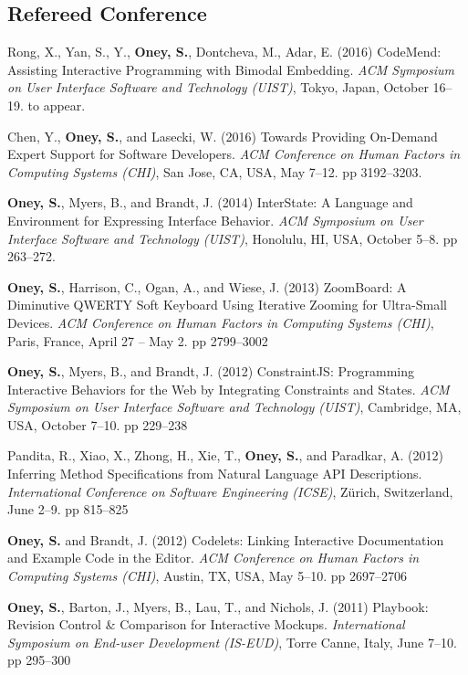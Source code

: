 \subsection{Refereed Conference}

 {
    Rong, X., Yan, S., Y., \textbf{Oney, S.}, Dontcheva, M., Adar, E. (2016) CodeMend: Assisting Interactive Programming with Bimodal Embedding. \textit{ACM Symposium on User Interface Software and Technology (UIST)}, Tokyo, Japan, October 16--19. to appear.
}

 {
    Chen, Y., \textbf{Oney, S.}, and Lasecki, W. (2016) Towards Providing On-Demand Expert Support for Software Developers. \textit{ACM Conference on Human Factors in Computing Systems (CHI)}, San Jose, CA, USA, May 7--12. pp 3192--3203.
}

 {
    \textbf{Oney, S.}, Myers, B., and Brandt, J. (2014) InterState: A Language and Environment for Expressing Interface Behavior. \textit{ACM Symposium on User Interface Software and Technology (UIST)}, Honolulu, HI, USA, October 5--8.  pp 263--272.
}

 {
\textbf{Oney, S.}, Harrison, C., Ogan, A., and Wiese, J. (2013) ZoomBoard: A Diminutive QWERTY Soft Keyboard Using Iterative Zooming for Ultra-Small Devices. \textit{ACM Conference on Human Factors in Computing Systems (CHI)}, Paris, France, April 27 -- May 2. pp 2799--3002
}

 {
\textbf{Oney, S.}, Myers, B., and Brandt, J. (2012) ConstraintJS: Programming Interactive Behaviors for the Web by Integrating Constraints and States. \textit{ACM Symposium on User Interface Software and Technology (UIST)}, Cambridge, MA, USA, October 7--10. pp 229--238
}

 {
Pandita, R., Xiao, X., Zhong, H., Xie, T., \textbf{Oney, S.}, and Paradkar, A. (2012) Inferring Method Specifications from Natural Language API Descriptions. \textit{International Conference on Software Engineering (ICSE)}, Z{\"u}rich, Switzerland, June 2--9. pp 815--825
}

 {
\textbf{Oney, S.} and Brandt, J. (2012) Codelets: Linking Interactive Documentation and Example Code in the Editor. \textit{ACM Conference on Human Factors in Computing Systems (CHI)}, Austin, TX, USA, May 5--10. pp 2697--2706
}

 {
\textbf{Oney, S.}, Barton, J., Myers, B., Lau, T., and Nichols, J. (2011) Playbook: Revision Control \& Comparison for Interactive Mockups. \textit{International Symposium on End-user Development (IS-EUD)}, Torre Canne, Italy, June 7--10. pp 295--300
}

